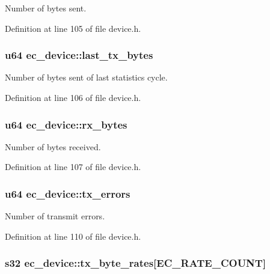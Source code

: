 Number of bytes sent. 



Definition at line 105 of file device.\-h.

\subsubsection[{last\-\_\-tx\-\_\-bytes}]{\setlength{\rightskip}{0pt plus 5cm}u64 ec\-\_\-device\-::last\-\_\-tx\-\_\-bytes}\label{structec__device_ac4a738c0943134edc5c68f2c85b9a089}


Number of bytes sent of last statistics cycle. 



Definition at line 106 of file device.\-h.

\subsubsection[{rx\-\_\-bytes}]{\setlength{\rightskip}{0pt plus 5cm}u64 ec\-\_\-device\-::rx\-\_\-bytes}\label{structec__device_afea25f45c6911c97a08b8615154a2b91}


Number of bytes received. 



Definition at line 107 of file device.\-h.

\subsubsection[{tx\-\_\-errors}]{\setlength{\rightskip}{0pt plus 5cm}u64 ec\-\_\-device\-::tx\-\_\-errors}\label{structec__device_a076ce4fd0d53e53ba7236b12bf4ecf66}


Number of transmit errors. 



Definition at line 110 of file device.\-h.

\subsubsection[{tx\-\_\-byte\-\_\-rates}]{\setlength{\rightskip}{0pt plus 5cm}s32 ec\-\_\-device\-::tx\-\_\-byte\-\_\-rates[{\bf E\-C\-\_\-\-R\-A\-T\-E\-\_\-\-C\-O\-U\-N\-T}]}\label{structec__device_a5decb734bd07c7e1a1b66e08904f0bba}


